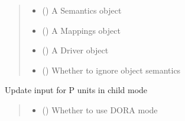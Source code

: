 \documentclass[letterpaper,10pt,english]{sphinxmanual}
\begin{document}
\begin{fulllineitems}
\begin{fulllineitems}
\begin{quote}
\begin{description}
\begin{itemize}
\item {} 
\sphinxAtStartPar
{} () \textendash{} A Semantics object

\item {} 
\sphinxAtStartPar
{} ({\hyperref[\detokenize{nodes:nodes.nodeMemObjects.Mappings}]{}}) \textendash{} A Mappings object

\item {} 
\sphinxAtStartPar
{} ({\hyperref[\detokenize{nodes:nodes.nodeTensors.Driver}]{}}) \textendash{} A Driver object

\item {} 
\sphinxAtStartPar
{} () \textendash{} Whether to ignore object semantics

\end{itemize}

\end{description}\end{quote}

\end{fulllineitems}


\begin{fulllineitems}
\label{\detokenize{nodes:nodes.nodeTensors.Recipient.update_input_p_child}}
\pysigstartsignatures
\pysiglinewithargsret
{}
{\sphinxparamcomma {}\sphinxparamcomma {}\sphinxparamcomma {}\sphinxparamcomma {}}
{}
\pysigstopsignatures
\sphinxAtStartPar
Update input for P units in child mode
\begin{quote}\begin{description}
\begin{itemize}
\item {} 
\sphinxAtStartPar
{} () \textendash{} Whether to use DORA mode


\end{itemize}
\end{description}
\end{quote}
\end{fulllineitems}
\end{fulllineitems}
\end{document}
